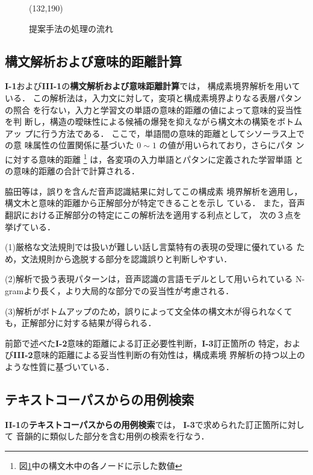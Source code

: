 \begin{figure}[hp]
\begin{center}
\atari(132,190)
\caption{提案手法の処理の流れ}
\label{process-flow}
\end{center}
\end{figure}


\subsection{構文解析および意味的距離計算}

{\bf I-1}および{\bf III-1}の{\bf 構文解析および意味距離計算}では，
構成素境界解析\cite{Furuse1999}を用いている．
この解析法は，入力文に対して，変項と構成素境界よりなる表層パタンの照合
を行ない，入力と学習文の単語の意味的距離の値によって意味的妥当性を判
断し，構造の曖昧性による候補の爆発を抑えながら構文木の構築をボトムアッ
プに行う方法である．
ここで，単語間の意味的距離としてシソーラス\cite{Kadokawa1981}上での意
味属性の位置関係に基づいた $0 \sim 1$ の値が用いられており，さらにパタ
ンに対する意味的距離
\footnote{図\ref{process-flow}中の構文木中の各ノードに示した数値}
は，各変項の入力単語とパタンに定義された学習単語
との意味的距離の合計で計算される．

脇田等\cite{Wakita1998}は，誤りを含んだ音声認識結果に対してこの構成素
境界解析を適用し，構文木と意味的距離から正解部分が特定できることを示し
ている．
また，音声翻訳における正解部分の特定にこの解析法を適用する利点として，
次の３点を挙げている．

(1)厳格な文法規則では扱いが難しい話し言葉特有の表現の受理に優れている
ため，文法規則から逸脱する部分を認識誤りと判断しやすい．

(2)解析で扱う表現パターンは，音声認識の言語モデルとして用いられている
N-gramより長く，より大局的な部分での妥当性が考慮される．

(3)解析がボトムアップのため，誤りによって文全体の構文木が得られなくて
も，正解部分に対する結果が得られる．

前節で述べた{\bf I-2}意味的距離による訂正必要性判断，{\bf I-3}訂正箇所の
特定，および{\bf III-2}意味的距離による妥当性判断の有効性は，構成素境
界解析の持つ以上のような性質に基づいている．


\subsection{テキストコーパスからの用例検索}

{\bf II-1}の{\bf テキストコーパスからの用例検索}では，
{\bf I-3}で求められた訂正箇所に対して
音韻的に類似した部分を含む用例の検索を行なう．

